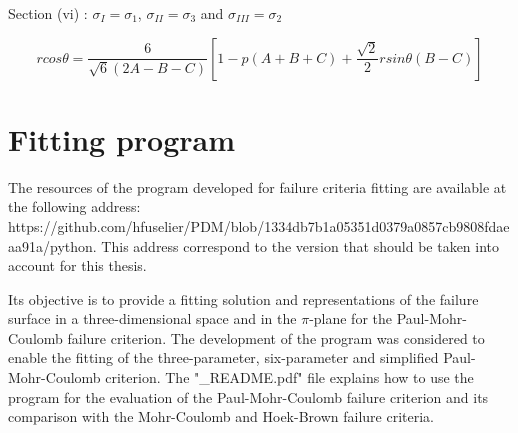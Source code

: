 Section (vi) : $\sigma_I = \sigma_1$, $\sigma_{II} = \sigma_3$ and $\sigma_{III} = \sigma_2$

\begin{equation}
    r cos\theta = \frac{6}{\sqrt{6}(2A-B-C)} \left[ 1-p(A+B+C)+ \frac{\sqrt{2}}{2} r sin \theta (B-C) \right]
\end{equation}


\chapter{Fitting program}\label{App:C}

The resources of the program developed for failure criteria fitting are available at the following address: https://github.com/hfuselier/PDM/blob/1334db7b1a05351d0379a0857cb9808fdaeaa91a/python. This address correspond to the version that should be taken into account for this thesis. 

Its objective is to provide a fitting solution and representations of the failure surface in a three-dimensional space and in the $\pi$-plane for the Paul-Mohr-Coulomb failure criterion. The development of the program was considered to enable the fitting of the three-parameter, six-parameter and simplified Paul-Mohr-Coulomb criterion. The "\_README.pdf" file explains how to use the program for the evaluation  of the Paul-Mohr-Coulomb failure criterion and its comparison with the Mohr-Coulomb and Hoek-Brown failure criteria. 

